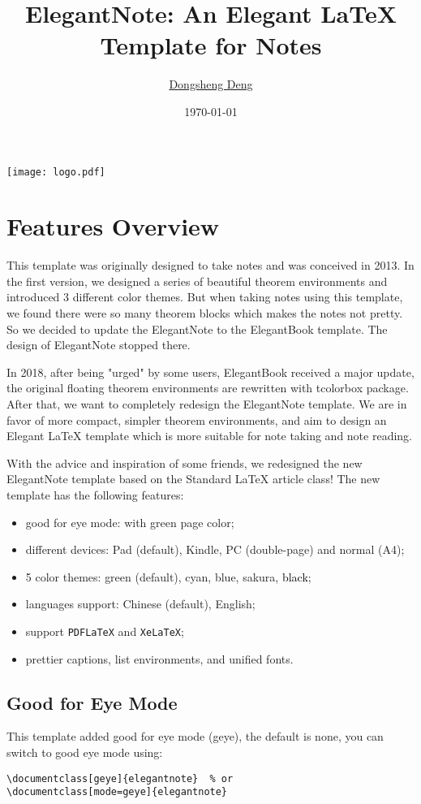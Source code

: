 \documentclass[geye,green,pad,en]{elegantnote}
\title{ElegantNote: An Elegant \LaTeX{} Template for Notes}
\author{\href{https://ddswhu.me/}{Dongsheng Deng}}
\institute{\href{https://elegantlatex.org/}{Elegant\LaTeX{} Program}}
\date{\today}
\begin{document}
\maketitle
\centerline{\texttt{[image: logo.pdf]}}

\section{Features Overview}
This template was originally designed to take notes and was conceived in 2013. In the first version, we designed a  series of beautiful theorem environments and introduced 3 different color themes. But when taking notes using this template, we found there were so many theorem blocks which makes the notes not pretty. So we decided to update the ElegantNote to the ElegantBook template. The design of ElegantNote stopped there.

In 2018, after being "urged" by some users, ElegantBook received a major update, the original floating theorem environments are rewritten with tcolorbox package. After that, we want to completely redesign the ElegantNote template. We are in favor of more compact, simpler theorem environments, and aim to design an Elegant \LaTeX{} template which is more suitable for note taking and note reading.

With the advice and inspiration of some friends, we redesigned the new ElegantNote template based on the Standard \LaTeX{} article class! The new template has the following features:

\begin{itemize}
\item good for eye mode: with green page color;
\item different devices: Pad (default), Kindle, PC (double-page) and normal (A4);
\item 5 color themes: \textcolor{egreen}{green} (default), \textcolor{ecyan}{cyan}, \textcolor{eblue}{blue}, \textcolor{sakura}{sakura}, \textcolor{black}{black};
\item languages support: Chinese (default), English;
\item support \lstinline{PDFLaTeX} and \lstinline{XeLaTeX};
\item prettier captions, list environments, and unified fonts.
\end{itemize}

\subsection{Good for Eye Mode}
This template added good for eye mode (geye), the default is none, you can switch to good eye mode using:
\begin{lstlisting}[frame=none]  
\documentclass[geye]{elegantnote}  % or
\documentclass[mode=geye]{elegantnote}
\end{lstlisting}
\end{document}
